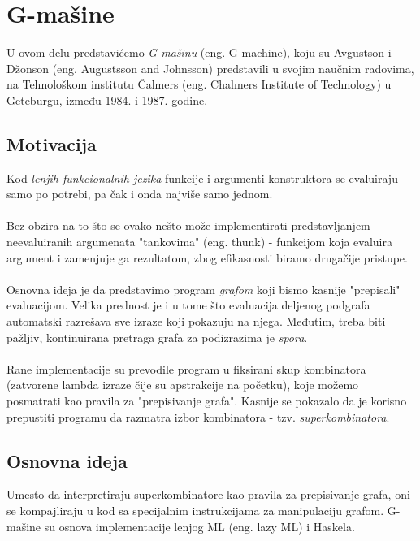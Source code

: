 \section{G-mašine}
\label{sec:Gmasine}

U ovom delu predstavićemo {\em G mašinu} (eng. G-machine), koju su Avgustson i Džonson (eng. Augustsson and Johnsson) predstavili u svojim naučnim radovima, na Tehnološkom institutu Čalmers (eng. Chalmers Institute of Technology) u Geteburgu, između 1984. i 1987. godine. 

\subsection{Motivacija}
Kod {\em lenjih funkcionalnih jezika} funkcije i argumenti konstruktora se evaluiraju samo po potrebi, pa čak i onda najviše samo jednom. \\
\\Bez obzira na to što se ovako nešto može implementirati predstavljanjem neevaluiranih argumenata "tankovima" (eng. thunk) - funkcijom koja evaluira argument i zamenjuje ga rezultatom, zbog efikasnosti biramo drugačije pristupe. \\ \\Osnovna ideja je da predstavimo program {\em grafom} koji bismo kasnije "prepisali"  evaluacijom. Velika prednost je i u tome što evaluacija deljenog podgrafa automatski razrešava sve izraze koji pokazuju na njega. Međutim, treba biti pažljiv, kontinuirana pretraga grafa za podizrazima je {\em spora}. \\\\
Rane implementacije su prevodile program u fiksirani skup kombinatora (zatvorene lambda izraze čije su apstrakcije na početku), koje možemo posmatrati kao pravila za "prepisivanje grafa". Kasnije se pokazalo da je korisno prepustiti programu da razmatra izbor kombinatora - tzv. {\em superkombinatora}. \\ %


\subsection{Osnovna ideja} 
Umesto da interpretiraju superkombinatore kao pravila za prepisivanje grafa, oni se kompajliraju u kod sa specijalnim instrukcijama za manipulaciju grafom. G-mašine su osnova implementacije lenjog ML (eng. lazy ML) i Haskela.\\ 

